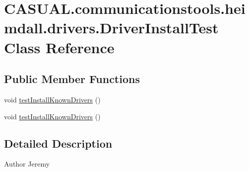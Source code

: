 \hypertarget{class_c_a_s_u_a_l_1_1communicationstools_1_1heimdall_1_1drivers_1_1_driver_install_test}{\section{C\-A\-S\-U\-A\-L.\-communicationstools.\-heimdall.\-drivers.\-Driver\-Install\-Test Class Reference}
\label{class_c_a_s_u_a_l_1_1communicationstools_1_1heimdall_1_1drivers_1_1_driver_install_test}
}
\subsection*{Public Member Functions}
\begin{DoxyCompactItemize}
\item 
void \hyperlink{class_c_a_s_u_a_l_1_1communicationstools_1_1heimdall_1_1drivers_1_1_driver_install_test_a46bf25cfb893cbc52e9cd5803b073472}{test\-Install\-Known\-Drivers} ()
\item 
void \hyperlink{class_c_a_s_u_a_l_1_1communicationstools_1_1heimdall_1_1drivers_1_1_driver_install_test_a46bf25cfb893cbc52e9cd5803b073472}{test\-Install\-Known\-Drivers} ()
\end{DoxyCompactItemize}


\subsection{Detailed Description}
\begin{DoxyAuthor}{Author}
Jeremy 
\end{DoxyAuthor}


